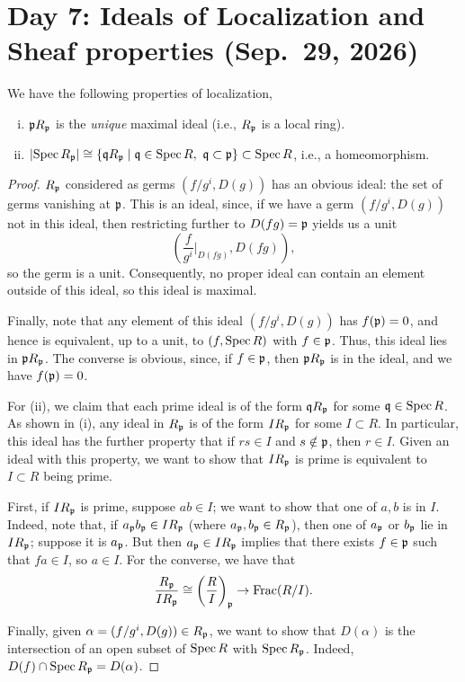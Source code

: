 \section{Day 7: Ideals of Localization and Sheaf properties (Sep.\ 29, 2026)}
\begin{theorem} \label{thm:localization_ideals}
    We have the following properties of localization,
    \begin{enumerate}[(i)]
        \item $\mathfrak p R_\mathfrak p$ is the \textit{unique} maximal ideal (i.e., $R_\mathfrak p$ is a local ring).
        \item $\left\lvert \operatorname{Spec} R_\mathfrak p \right\rvert \cong \{\mathfrak q R_\mathfrak p \mid \mathfrak q \in \operatorname{Spec} R, \, \, \mathfrak q \subset \mathfrak p\} \subset \operatorname{Spec} R$, i.e., a homeomorphism.
    \end{enumerate}
\end{theorem}
\begin{proof}
    $R_\mathfrak p$ considered as germs $(f/g^i, D(g))$ has an obvious ideal: the set of germs vanishing at $\mathfrak p$. This is an ideal, since, if we have a germ $(f/g^i, D(g))$ not in this ideal, then restricting further to $D(fg) = \mathfrak p$ yields us a unit
    \[ \left(\frac{f}{g^i}\biggr\rvert_{D(fg)}, D(fg)\right), \]
    so the germ is a unit. Consequently, no proper ideal can contain an element outside of this ideal, so this ideal is maximal.

    Finally, note that any element of this ideal $(f/g^i, D(g))$ has $f(\mathfrak p) = 0$, and hence is equivalent, up to a unit, to $(f, \operatorname{Spec} R)$ with $f \in \mathfrak p$. Thus, this ideal lies in $\mathfrak p R_\mathfrak p$. The converse is obvious, since, if $f \in \mathfrak p$, then $\mathfrak p R_\mathfrak p$ is in the ideal, and we have $f(\mathfrak p) = 0$.

    For (ii), we claim that each prime ideal is of the form $\mathfrak q R_\mathfrak p$ for some $\mathfrak q \in \operatorname{Spec} R$. As shown in (i), any ideal in $R_\mathfrak p$ is of the form $I R_\mathfrak p$ for some $I \subset R$. In particular, this ideal has the further property that if $rs \in I$ and $s \notin \mathfrak p$, then $r \in I$. Given an ideal with this property, we want to show that $I R_\mathfrak p$ is prime is equivalent to $I \subset R$ being prime.

    First, if $I R_\mathfrak p$ is prime, suppose $ab \in I$; we want to show that one of $a, b$ is in $I$. Indeed, note that, if $a_\mathfrak p b_\mathfrak p \in I R_\mathfrak p$ (where $a_\mathfrak p, b_\mathfrak p \in R_\mathfrak p$), then one of $a_\mathfrak p$ or $b_\mathfrak p$ lie in $I R_\mathfrak p$; suppose it is $a_\mathfrak p$. But then $a_\mathfrak p \in I R_\mathfrak p$ implies that there exists $f \in \mathfrak p$ such that $fa \in I$, so $a \in I$. For the converse, we have that
    \[ \frac{R_\mathfrak p}{I R_\mathfrak p} \cong \left(\frac{R}{I}\right)_\mathfrak p \to \operatorname{Frac}(R/I). \]
    
    Finally, given $\alpha = (f/g^i, D(g)) \in R_\mathfrak p$, we want to show that $D(\alpha)$ is the intersection of an open subset of $\operatorname{Spec} R$ with $\operatorname{Spec} R_\mathfrak p$. Indeed, $D(f) \cap \operatorname{Spec} R_\mathfrak p = D(\alpha)$.
\end{proof}


